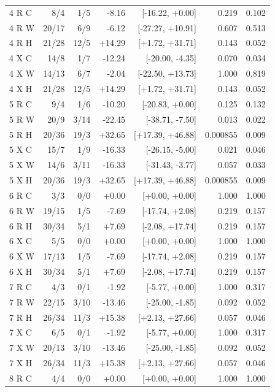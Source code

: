 \begin{longtable}{lrrrrrr}
4 R C & 8/4 & 1/5 & -8.16 & [-16.22, +0.00] & 0.219 & 0.102\\
4 R W & 20/17 & 6/9 & -6.12 & [-27.27, +10.91] & 0.607 & 0.513\\
4 R H & 21/28 & 12/5 & +14.29 & [+1.72, +31.71] & 0.143 & 0.052\\
4 X C & 14/8 & 1/7 & -12.24 & [-20.00, -4.35] & 0.070 & 0.034\\
4 X W & 14/13 & 6/7 & -2.04 & [-22.50, +13.73] & 1.000 & 0.819\\
4 X H & 21/28 & 12/5 & +14.29 & [+1.72, +31.71] & 0.143 & 0.052\\
5 R C & 9/4 & 1/6 & -10.20 & [-20.83, +0.00] & 0.125 & 0.132\\
5 R W & 20/9 & 3/14 & -22.45 & [-38.71, -7.50] & 0.013 & 0.022\\
5 R H & 20/36 & 19/3 & +32.65 & [+17.39, +46.88] & 0.000855 & 0.009\\
5 X C & 15/7 & 1/9 & -16.33 & [-26.15, -5.00] & 0.021 & 0.046\\
5 X W & 14/6 & 3/11 & -16.33 & [-31.43, -3.77] & 0.057 & 0.033\\
5 X H & 20/36 & 19/3 & +32.65 & [+17.39, +46.88] & 0.000855 & 0.009\\
6 R C & 3/3 & 0/0 & +0.00 & [+0.00, +0.00] & 1.000 & 1.000\\
6 R W & 19/15 & 1/5 & -7.69 & [-17.74, +2.08] & 0.219 & 0.157\\
6 R H & 30/34 & 5/1 & +7.69 & [-2.08, +17.74] & 0.219 & 0.157\\
6 X C & 5/5 & 0/0 & +0.00 & [+0.00, +0.00] & 1.000 & 1.000\\
6 X W & 17/13 & 1/5 & -7.69 & [-17.74, +2.08] & 0.219 & 0.157\\
6 X H & 30/34 & 5/1 & +7.69 & [-2.08, +17.74] & 0.219 & 0.157\\
7 R C & 4/3 & 0/1 & -1.92 & [-5.77, +0.00] & 1.000 & 0.317\\
7 R W & 22/15 & 3/10 & -13.46 & [-25.00, -1.85] & 0.092 & 0.052\\
7 R H & 26/34 & 11/3 & +15.38 & [+2.13, +27.66] & 0.057 & 0.046\\
7 X C & 6/5 & 0/1 & -1.92 & [-5.77, +0.00] & 1.000 & 0.317\\
7 X W & 20/13 & 3/10 & -13.46 & [-25.00, -1.85] & 0.092 & 0.052\\
7 X H & 26/34 & 11/3 & +15.38 & [+2.13, +27.66] & 0.057 & 0.046\\
8 R C & 4/4 & 0/0 & +0.00 & [+0.00, +0.00] & 1.000 & 1.000\\

\end{longtable}
